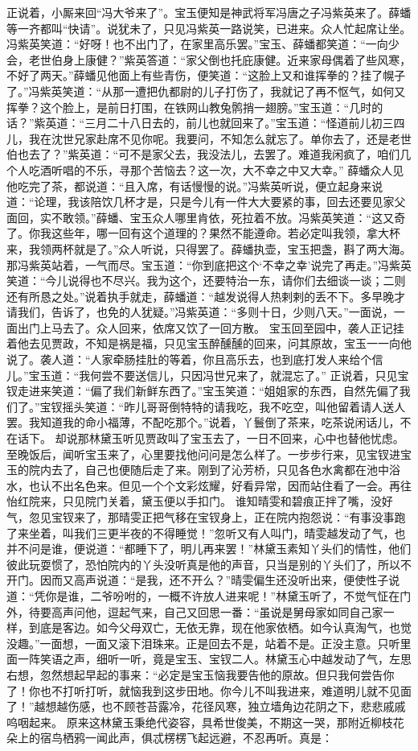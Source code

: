 \documentclass[12pt,oneside]{book}
\begin{document}
正说着，小厮来回“冯大爷来了”。宝玉便知是神武将军冯唐之子冯紫英来了。薛蟠等一齐都叫“快请”。说犹未了，只见冯紫英一路说笑，已进来。众人忙起席让坐。冯紫英笑道：“好呀！也不出门了，在家里高乐罢。”宝玉、薛蟠都笑道：“一向少会，老世伯身上康健？”紫英答道：“家父倒也托庇康健。近来家母偶着了些风寒，不好了两天。”薛蟠见他面上有些青伤，便笑道：“这脸上又和谁挥拳的？挂了幌子了。”冯紫英笑道：“从那一遭把仇都尉的儿子打伤了，我就记了再不怄气，如何又挥拳？这个脸上，是前日打围，在铁网山教兔鹘捎一翅膀。”宝玉道：“几时的话？”紫英道：“三月二十八日去的，前儿也就回来了。”宝玉道：“怪道前儿初三四儿，我在沈世兄家赴席不见你呢。我要问，不知怎么就忘了。单你去了，还是老世伯也去了？”紫英道：“可不是家父去，我没法儿，去罢了。难道我闲疯了，咱们几个人吃酒听唱的不乐，寻那个苦恼去？这一次，大不幸之中又大幸。”
薛蟠众人见他吃完了茶，都说道：“且入席，有话慢慢的说。”冯紫英听说，便立起身来说道：“论理，我该陪饮几杯才是，只是今儿有一件大大要紧的事，回去还要见家父面回，实不敢领。”薛蟠、宝玉众人哪里肯依，死拉着不放。冯紫英笑道：“这又奇了。你我这些年，哪一回有这个道理的？果然不能遵命。若必定叫我领，拿大杯来，我领两杯就是了。”众人听说，只得罢了。薛蟠执壶，宝玉把盏，斟了两大海。那冯紫英站着，一气而尽。宝玉道：“你到底把这个‘不幸之幸’说完了再走。”冯紫英笑道：“今儿说得也不尽兴。我为这个，还要特治一东，请你们去细谈一谈；二则还有所恳之处。”说着执手就走，薛蟠道：“越发说得人热剌剌的丢不下。多早晚才请我们，告诉了，也免的人犹疑。”冯紫英道：“多则十日，少则八天。”一面说，一面出门上马去了。众人回来，依席又饮了一回方散。
宝玉回至园中，袭人正记挂着他去见贾政，不知是祸是福，只见宝玉醉醺醺的回来，问其原故，宝玉一一向他说了。袭人道：“人家牵肠挂肚的等着，你且高乐去，也到底打发人来给个信儿。”宝玉道：“我何尝不要送信儿，只因冯世兄来了，就混忘了。”
正说着，只见宝钗走进来笑道：“偏了我们新鲜东西了。”宝玉笑道：“姐姐家的东西，自然先偏了我们了。”宝钗摇头笑道：“昨儿哥哥倒特特的请我吃，我不吃空，叫他留着请人送人罢。我知道我的命小福薄，不配吃那个。”说着，丫鬟倒了茶来，吃茶说闲话儿，不在话下。
却说那林黛玉听见贾政叫了宝玉去了，一日不回来，心中也替他忧虑。至晚饭后，闻听宝玉来了，心里要找他问问是怎么样了。一步步行来，见宝钗进宝玉的院内去了，自己也便随后走了来。刚到了沁芳桥，只见各色水禽都在池中浴水，也认不出名色来。但见一个个文彩炫耀，好看异常，因而站住看了一会。再往怡红院来，只见院门关着，黛玉便以手扣门。
谁知晴雯和碧痕正拌了嘴，没好气，忽见宝钗来了，那晴雯正把气移在宝钗身上，正在院内抱怨说：“有事没事跑了来坐着，叫我们三更半夜的不得睡觉！”忽听又有人叫门，晴雯越发动了气，也并不问是谁，便说道：“都睡下了，明儿再来罢！”林黛玉素知丫头们的情性，他们彼此玩耍惯了，恐怕院内的丫头没听真是他的声音，只当是别的丫头们了，所以不开门。因而又高声说道：“是我，还不开么？”晴雯偏生还没听出来，便使性子说道：“凭你是谁，二爷吩咐的，一概不许放人进来呢！”林黛玉听了，不觉气怔在门外，待要高声问他，逗起气来，自己又回思一番：“虽说是舅母家如同自己家一样，到底是客边。如今父母双亡，无依无靠，现在他家依栖。如今认真淘气，也觉没趣。”一面想，一面又滚下泪珠来。正是回去不是，站着不是。正没主意。只听里面一阵笑语之声，细听一听，竟是宝玉、宝钗二人。林黛玉心中越发动了气，左思右想，忽然想起早起的事来：“必定是宝玉恼我要告他的原故。但只我何尝告你了！你也不打听打听，就恼我到这步田地。你今儿不叫我进来，难道明儿就不见面了！”越想越伤感，也不顾苍苔露冷，花径风寒，独立墙角边花阴之下，悲悲戚戚呜咽起来。
原来这林黛玉秉绝代姿容，具希世俊美，不期这一哭，那附近柳枝花朵上的宿鸟栖鸦一闻此声，俱忒楞楞飞起远避，不忍再听。真是：
\end{document}
